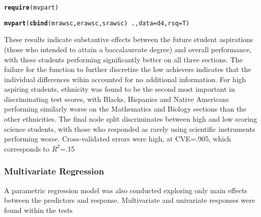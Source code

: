 \documentclass{article}\usepackage[]{graphicx}\usepackage[]{color}
\makeatletter
\newcommand{\hlopt}[1]{\textcolor[rgb]{0,0,0}{#1}}%
\newcommand{\hlstd}[1]{\textcolor[rgb]{0.345,0.345,0.345}{#1}}%
\newcommand{\hlkwc}[1]{\textcolor[rgb]{0.333,0.667,0.333}{#1}}%
\newcommand{\hlkwd}[1]{\textcolor[rgb]{0.737,0.353,0.396}{\textbf{#1}}}%
\newenvironment{kframe}{%
 \def\at@end@of@kframe{}%
 \ifinner\ifhmode%
  \def\at@end@of@kframe{\end{minipage}}%
  \begin{minipage}{\columnwidth}%
 \fi\fi%
 \def\FrameCommand##1{\hskip\@totalleftmargin \hskip-\fboxsep
 \colorbox{shadecolor}{##1}\hskip-\fboxsep
     \hskip-\linewidth \hskip-\@totalleftmargin \hskip\columnwidth}%
 \MakeFramed {\advance\hsize-\width
   \@totalleftmargin\z@ \linewidth\hsize
   \@setminipage}}%
 {\par\unskip\endMakeFramed%
 \at@end@of@kframe}
\newenvironment{knitrout}{}{} %
\makeatother
\begin{document}
\begin{knitrout}
\color{fgcolor}\begin{kframe}
\begin{alltt}
\hlkwd{require}\hlstd{(mvpart)}
\end{alltt}


{\ttfamily\noindent\itshape\color{messagecolor}{\#\# Loading required package: mvpart}}\begin{alltt}
\hlkwd{mvpart}\hlstd{(}\hlkwd{cbind}\hlstd{(mrawsc, erawsc, srawsc)} \hlopt{~} \hlstd{.,} \hlkwc{data} \hlstd{= d4,} \hlkwc{rsq} \hlstd{= T)}
\end{alltt}


{\ttfamily\noindent\bfseries\color{errorcolor}{\#\# Error: object 'd4' not found}}\end{kframe}
\end{knitrout}


These results indicate substantive effects between the future student aspirations (those who intended to attain a baccalaureate degree) and overall performance, with these students performing significantly better on all three sections. The failure for the function to further discretize the low achievers indicates that the individual differences wihin accounted for no additional information. For high aspiring students, ethnicity was found to be the second most important in discriminating test scores, with Blacks, Hispanics and Native Americans performing similarly worse on the Mathematics and Biology sections than the other ethnicities. The final node split discriminates between high and low scoring science students, with those who responded as rarely using scientific instruments performing worse. Cross-validated errors were high, at CVE=.905, which corresponds to $R^2$=.15
\subsubsection{Multivariate Regression}
A parametric regression model was also conducted exploring only main effects between the predictors and response. Multivariate and univariate responses were found within the tests
\end{document}
